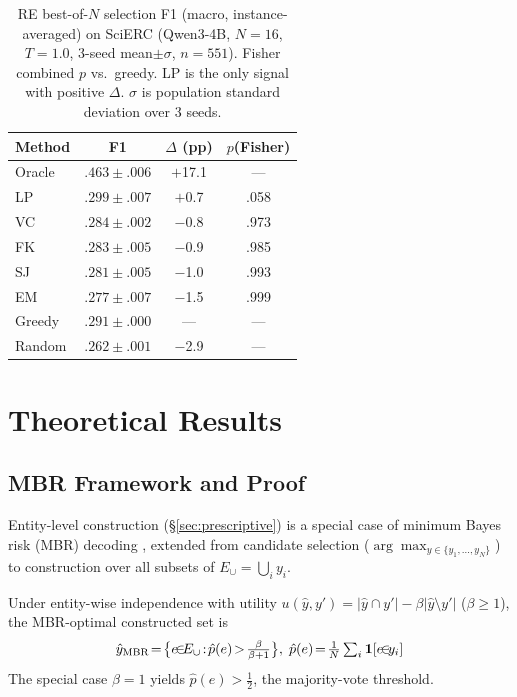 \begin{table}[t]
\centering
\small
\caption{RE best-of-$N$ selection F1 (macro, instance-averaged) on SciERC (Qwen3-4B, $N{=}16$, $T{=}1.0$, 3-seed mean${\pm}\sigma$, $n{=}551$). Fisher combined $p$ vs.\ greedy. LP is the only signal with positive $\Delta$. $\sigma$ is population standard deviation over 3 seeds.}
\label{tab:re_n16_selection}
\begin{tabular}{lccc}
\toprule
Method & F1 & $\Delta$ (pp) & $p$(Fisher) \\
\midrule
Oracle & $.463{\pm}.006$ & $+$17.1 & --- \\
\midrule
LP & $\mathbf{.299}{\pm}.007$ & $+$0.7 & .058 \\
VC & $.284{\pm}.002$ & $-$0.8 & .973 \\
FK & $.283{\pm}.005$ & $-$0.9 & .985 \\
SJ & $.281{\pm}.005$ & $-$1.0 & .993 \\
EM & $.277{\pm}.007$ & $-$1.5 & .999 \\
\midrule
Greedy & $.291{\pm}.000$ & --- & --- \\
Random & $.262{\pm}.001$ & $-$2.9 & --- \\
\bottomrule
\end{tabular}
\end{table}

\section{Theoretical Results}\label{app:mbr_discussion}

\subsection{MBR Framework and Proof}\label{app:mbr_proof}

Entity-level construction (\S\ref{sec:prescriptive}) is a special case of minimum Bayes risk (MBR) decoding \cite{kumar2004minimum, eikema2020map}, extended from candidate selection ($\arg\max_{y \in \{y_1,\ldots,y_N\}}$) to construction over all subsets of $E_\cup{=}\bigcup_i y_i$.

\begin{proposition}\label{prop:construction_mbr}
Under entity-wise independence with utility $u(\hat{y}, y') = |\hat{y} \cap y'| - \beta|\hat{y} \setminus y'|$ ($\beta \geq 1$), the MBR-optimal constructed set is
\begin{equation}\label{eq:mbr_construction}
\hat{y}_{\textup{MBR}} \!=\! \bigl\{e \!{\in}\! E_\cup \!:\! \hat{p}(e) \!>\! \tfrac{\beta}{\beta{+}1}\bigr\},\; \hat{p}(e) \!=\! \tfrac{1}{N} \textstyle\sum\nolimits_{i} \mathbf{1}[e \!{\in}\! y_i]
\end{equation}
The special case $\beta{=}1$ yields $\hat{p}(e) > \tfrac{1}{2}$, the majority-vote threshold.
\end{proposition}

